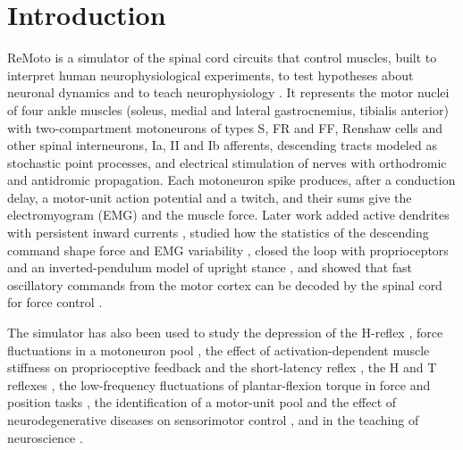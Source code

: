 \documentclass[pdflatex,sn-apa,iicol]{sn-jnl}
\begin{document}

\maketitle

\section{Introduction}\label{sec:intro}

ReMoto is a simulator of the spinal cord circuits that control muscles, built to interpret human neurophysiological experiments, to test hypotheses about neuronal dynamics and to teach neurophysiology \citep{Cisi2008}. It represents the motor nuclei of four ankle muscles (soleus, medial and lateral gastrocnemius, tibialis anterior) with two-compartment motoneurons of types S, FR and FF, Renshaw cells and other spinal interneurons, Ia, II and Ib afferents, descending tracts modeled as stochastic point processes, and electrical stimulation of nerves with orthodromic and antidromic propagation. Each motoneuron spike produces, after a conduction delay, a motor-unit action potential and a twitch, and their sums give the electromyogram (EMG) and the muscle force. Later work added active dendrites with persistent inward currents \citep{Elias2012,Elias2013}, studied how the statistics of the descending command shape force and EMG variability \citep{Watanabe2013}, closed the loop with proprioceptors and an inverted-pendulum model of upright stance \citep{Elias2014}, and showed that fast oscillatory commands from the motor cortex can be decoded by the spinal cord for force control \citep{Watanabe2015}.

The simulator has also been used to study the depression of the H-reflex \citep{Cisi2007}, force fluctuations in a motoneuron pool \citep{Kohn2009}, the effect of activation-dependent muscle stiffness on proprioceptive feedback and the short-latency reflex \citep{Chaud2012}, the H and T reflexes \citep{Mezzarane2013}, the low-frequency fluctuations of plantar-flexion torque in force and position tasks \citep{Watanabe2013ner}, the identification of a motor-unit pool \citep{Watanabe2014} and the effect of neurodegenerative diseases on sensorimotor control \citep{Elias2018,Oliveira2022}, and in the teaching of neuroscience \citep{EliasKohn2013teaching}.
\end{document}
